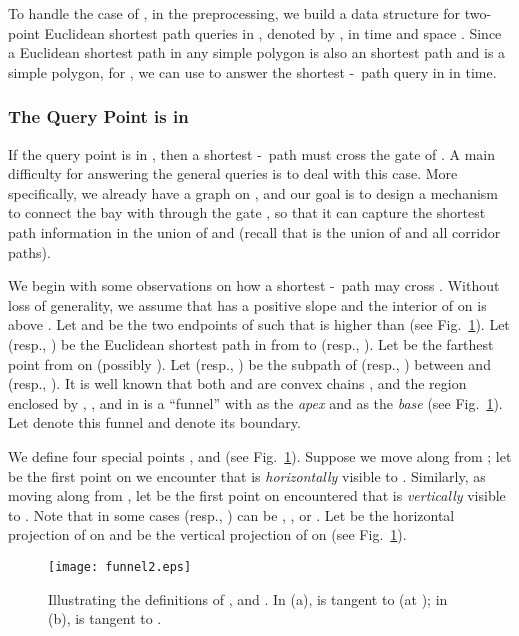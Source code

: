 \documentclass[english,runningheads,11pt]{llncs}
\def\st{-}
\begin{document}
To handle the case of , in the preprocessing,
we build a data structure for two-point Euclidean shortest path queries
in , denoted by ,
in  time and space \cite{ref:GuibasOp89}.
Since a Euclidean shortest path in any simple polygon is also an 
shortest path and  is a simple polygon, for , we can use  to
answer the shortest \st\ path query in  in  time.


\subsubsection{The Query Point  is in }

If the query point  is in , then a shortest \st\ path must cross the gate  of
. A main difficulty for answering the general queries is to deal with this case.
More specifically, we already have a graph  on ,
and our goal is to design a mechanism to connect the bay  with
 through the gate , so that it can
capture the shortest path information in the union of  and  (recall that  is the union of  and all corridor paths).




We begin with some
observations on how a shortest \st\ path may cross . Without
loss of generality, we assume that  has a positive slope and
the interior of  on  is above .
Let  and  be the two endpoints of  such that 
is higher than  (see Fig.~\ref{fig:funnel2}).
Let  (resp., ) be the Euclidean shortest path in  from  to
 (resp., ).
Let  be the farthest point from  on 
(possibly ). Let  (resp., )
be the subpath of  (resp., )
between  and  (resp., ).
It is well known that both  and
 are convex chains \cite{ref:GuibasLi87,ref:LeeEu84}, and
the region enclosed by , , and  in  is a
``funnel'' with  as the {\em apex} and  as the {\em base} (see
Fig.~\ref{fig:funnel2}).  Let 
denote this funnel and  denote its boundary.

We define four special points , and  (see Fig.~\ref{fig:funnel2}).
Suppose we move along  from ; let  be the first point on 
we encounter that is {\em horizontally} visible to . Similarly, as
moving along  from , let  be the first point on  encountered
that is {\em vertically} visible to .
Note that in some cases  (resp., ) can be , , or .
Let  be the horizontal projection
of  on  and  be the vertical projection of
 on   (see Fig.~\ref{fig:funnel2}).


\begin{figure}[t]
\begin{minipage}[t]{\linewidth}
\begin{center}
\texttt{[image: funnel2.eps]}
\caption{\footnotesize Illustrating the definitions of
, and . In (a),  is tangent to  (at ); in (b),  is tangent to .}
\label{fig:funnel2}
\end{center}
\end{minipage}
\vspace*{-0.15in}
\end{figure}
\end{document}
